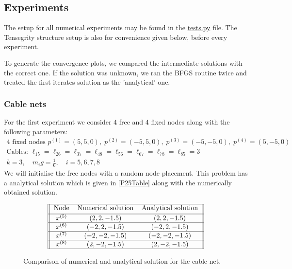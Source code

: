 \subsection{Experiments}\label{sec:experiments}
The setup for all numerical experiments may be found in the \href{https://github.com/otkulseng/Opt1_Project/blob/main/Kode/tests.py}{tests.py} file. The Tensegrity structure setup is also for convenience given below, before every experiment.

To generate the convergence plots, we compared the intermediate solutions with the correct one. If the solution was unknown, we ran the BFGS routine twice and treated the first iterates solution as the 'analytical' one.

\subsubsection{Cable nets}
For the first experiment we consider $4$ free and $4$ fixed nodes along with the following parameters:
\begin{equation*}
\begin{gathered}
    4 \text{ fixed nodes } p^{(1)} = (5,5,0),\; p^{(2)} = (-5,5,0),\; p^{(3)} = (-5,-5,0),\; p^{(4)} = (5,-5,0) \\
    \text{Cables: } \ell_{15} = \ell_{26} = \ell_{37} = \ell_{48} = \ell_{56} = \ell_{67} = \ell_{78} = \ell_{85} = 3\\ 
    k = 3, \quad m_i g = \frac{1}{6}, \quad i= 5,6,7,8 
\end{gathered}
\end{equation*}
We will initialise the free nodes with a random node placement. This problem has a analytical solution which is given in \eqref{P25Table} along with the numerically obtained solution. 

\begin{figure}    
\caption{Comparison of numerical and analytical solution for the cable net.}
\label{P25Table}
\begin{gather}
\begin{tabular}{||c c c||} 
    \hline
    Node & Numerical solution & Analytical solution \\ [0.5ex] 
    \hline
    $x^{(5)}$ & $(2,2,-1.5)$ & $(2,2,-1.5)$  \\ 
    \hline
    $x^{(6)}$ & $(-2,2,-1.5)$& $(-2,2,-1.5)$  \\ 
    \hline
    $x^{(7)}$ & $(-2,-2,-1.5)$ & $(-2,-2,-1.5)$\\ 
    \hline
    $x^{(8)}$ & $(2,-2,-1.5)$ & $(2,-2,-1.5)$ \\ 
    \hline
\end{tabular}
\end{gather}
\end{figure}



